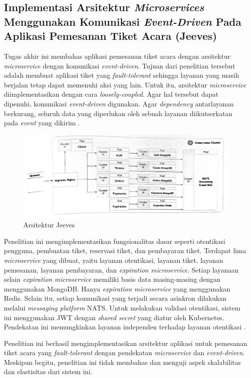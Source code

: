 \subsection{Implementasi Arsitektur \textit{Microservices} Menggunakan Komunikasi \textit{Event-Driven} Pada Aplikasi Pemesanan Tiket Acara (Jeeves)}

Tugas akhir ini membahas aplikasi pemesanan tiket acara dengan arsitektur \textit{microservice} dengan komunikasi \textit{event-driven}. Tujuan dari penelitian tersebut adalah membuat aplikasi tiket yang \textit{fault-tolerant} sehingga layanan yang masih berjalan tetap dapat memenuhi aksi yang lain. Untuk itu, arsitektur \textit{microservice} diimplementasikan dengan cara \textit{loosely-coupled}. Agar hal tersebut dapat dipenuhi, komunikasi \textit{event-driven} digunakan. Agar \textit{dependency} antarlayanan berkurang, seluruh data yang diperlukan oleh sebuah layanan diikutserkatan pada \textit{event} yang dikirim \parencite{microservicesEventDriven}.

\begin{figure}[ht]
    \centering
    \includegraphics[width=1\textwidth]{resources/chapter-2/jeeves.png}
    \caption{Arsitektur Jeeves \parencite{microservicesEventDriven}}
    \label{fig:jeeves-architecture}
\end{figure}

Penelitian ini mengimplementasikan fungsionalitas dasar seperti otentikasi pengguna, pembuatan tiket, reservasi tiket, dan pembayaran tiket. Terdapat lima \textit{microservice} yang dibuat, yaitu layanan otentikasi, layanan tiket, layanan pemesanan, layanan pembayaran, dan \textit{expiration microservice}. Setiap layanaan selain \textit{expiration microservice} memiliki basis data masing-masing dengan menggunakan MongoDB. Hanya \textit{expiration microservice} yang menggunakan Redis. Selain itu, setiap komunikasi yang terjadi secara asinkron dilakukan melalui \textit{messaging platform} NATS. Untuk melakukan validasi otentikasi, sistem ini menggunakan JWT dengan \textit{shared secret} yang diatur oleh Kubernetes. Pendekatan ini memungkinkan layanan independen terhadap layanan otentikasi \parencite{microservicesEventDriven}.

Penelitian ini berhasil mengimplementasikan arsitektur aplikasi untuk pemesanan tiket acara yang \textit{fault-tolerant} dengan pendekatan \textit{microservice} dan \textit{event-driven}. Meskipun begitu, penelitian ini tidak membahas dan menguji aspek skalabilitas dan elastisitas dari sistem ini.